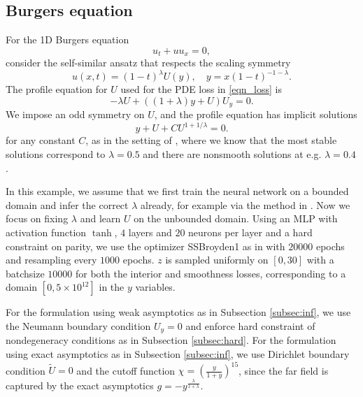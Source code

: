 \documentclass[12pt]{caltech_thesis}
\numberwithin{equation}{section}
\begin{document}
\subsection{Burgers equation}
For the 1D Burgers equation \begin{equation}
    u_t+uu_x=0,
\end{equation}
consider the self-similar ansatz that respects the scaling symmetry 
\begin{equation}
    u(x,t)=(1-t)^\lambda U(y),\quad y={x}{(1-t)^{-1-\lambda}}.
\end{equation}
The profile equation for $U$ used for the PDE loss in \eqref{eqn_loss} is
\begin{equation}\label{burgers_eqn}
    -\lambda U+((1+\lambda)y+U)U_y=0.
\end{equation}
We impose an odd symmetry on $U$, and the profile equation has implicit solutions  \begin{equation}
    y+ U+CU^{1+1/\lambda}=0.
\end{equation}
for any constant $C$, as in the setting of \cite{wang2023asymptotic}, where we know that the most stable solutions correspond to $\lambda =0.5$ and there are nonsmooth solutions at e.g. $\lambda =0.4$.

In this example, we assume that we first train the neural network on a bounded domain and infer the correct $\lambda$ already, for example via the method in \cite{wang2023asymptotic}. Now we focus on fixing $\lambda$ and learn $U$ on the unbounded domain. Using an MLP with activation function $\tanh$, $4$ layers and $20$ neurons per layer and a hard constraint on parity, we use the optimizer SSBroyden1 as in \cite{urban2025unveiling} with $20000$ epochs and resampling every $1000$ epochs. $z$ is sampled uniformly on $[0,30]$ with a batchsize $10000$ for both the interior and smoothness losses, corresponding to a domain $[0,5\times 10^{12}]$ in the $y$ variables.

For the formulation using weak asymptotics as in Subsection \ref{subsec:inf}, we use the Neumann boundary condition $U_y=0$ and enforce hard constraint of nondegeneracy conditions as in Subsection \ref{subsec:hard}. For the formulation using exact asymptotics as in Subsection \ref{subsec:inf}, we use Dirichlet boundary condition $\tilde{U}=0$ and the cutoff function $\chi=(\frac{y}{1+y})^{15}$, since the far field is captured by the exact asymptotics $g=-y^{\frac{\lambda}{1+\lambda}}$.
\end{document}

